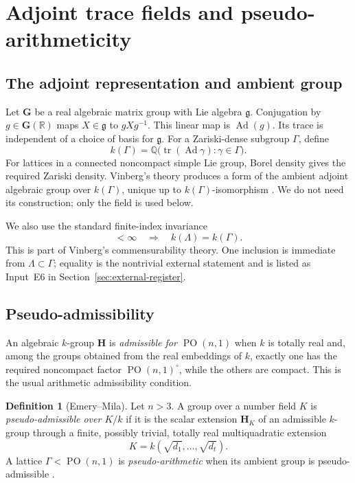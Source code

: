\documentclass[11pt]{article}
\numberwithin{equation}{section}
\theoremstyle{definition}
\newtheorem{definition}[theorem]{Definition}
\theoremstyle{remark}
\newcommand{\Q}{\mathbb{Q}}
\newcommand{\R}{\mathbb{R}}
\newcommand{\tr}{\operatorname{tr}}
\newcommand{\Ad}{\operatorname{Ad}}
\newcommand{\PO}{\operatorname{PO}}
\begin{document}
\section{Adjoint trace fields and pseudo-arithmeticity}
\label{sec:trace-fields}

\subsection{The adjoint representation and ambient group}

Let \(\mathbf G\) be a real algebraic matrix group with Lie algebra
\(\mathfrak g\).  Conjugation by \(g\in\mathbf G(\R)\) maps
\(X\in\mathfrak g\) to \(gXg^{-1}\).  This linear map is \(\Ad(g)\).  Its
trace is independent of a choice of basis for \(\mathfrak g\).  For a
Zariski-dense subgroup \(\Gamma\), define
\[
 k(\Gamma)=\Q\bigl(\tr(\Ad\gamma):\gamma\in\Gamma\bigr).
\]
For lattices in a connected noncompact simple Lie group, Borel density gives
the required Zariski density.  Vinberg's theory produces a form of the
ambient adjoint algebraic group over \(k(\Gamma)\), unique up to
\(k(\Gamma)\)-isomorphism \cite{VinbergRings}.  We do not need its
construction; only the field is used below.

We also use the standard finite-index invariance
\begin{equation}
 [\Gamma:\Lambda]<\infty
 \quad\Longrightarrow\quad k(\Lambda)=k(\Gamma).
\label{eq:finite-index-field}
\end{equation}
This is part of Vinberg's commensurability theory.  One inclusion is
immediate from \(\Lambda\subset\Gamma\); equality is the nontrivial external
statement and is listed as Input~E6 in
Section~\ref{sec:external-register}.

\subsection{Pseudo-admissibility}

An algebraic \(k\)-group \(\mathbf H\) is \emph{admissible for
\(\PO(n,1)\)} when \(k\) is totally real and, among the groups obtained from
the real embeddings of \(k\), exactly one has the required noncompact
factor \(\PO(n,1)^\circ\), while the others are compact.  This is the usual
arithmetic admissibility condition.

\begin{definition}[Emery--Mila]
Let \(n>3\).  A group over a number field \(K\) is
\emph{pseudo-admissible over \(K/k\)} if it is the scalar extension
\(\mathbf H_K\) of an admissible \(k\)-group through a finite, possibly
trivial, totally real multiquadratic extension
\[
 K=k(\sqrt{d_1},\ldots,\sqrt{d_t}).
\]
A lattice \(\Gamma<\PO(n,1)\) is \emph{pseudo-arithmetic} when its ambient
group is pseudo-admissible \cite[Definitions~1.6--1.7]{EmeryMila}.
\end{definition}
\end{document}
